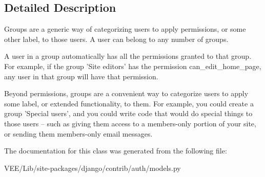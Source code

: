 \subsection{Detailed Description}
\begin{DoxyVerb}Groups are a generic way of categorizing users to apply permissions, or
some other label, to those users. A user can belong to any number of
groups.

A user in a group automatically has all the permissions granted to that
group. For example, if the group 'Site editors' has the permission
can_edit_home_page, any user in that group will have that permission.

Beyond permissions, groups are a convenient way to categorize users to
apply some label, or extended functionality, to them. For example, you
could create a group 'Special users', and you could write code that would
do special things to those users -- such as giving them access to a
members-only portion of your site, or sending them members-only email
messages.
\end{DoxyVerb}
 

The documentation for this class was generated from the following file\+:\begin{DoxyCompactItemize}
\item 
V\+E\+E/\+Lib/site-\/packages/django/contrib/auth/models.\+py\end{DoxyCompactItemize}
